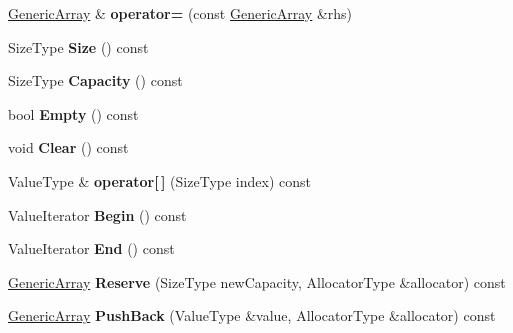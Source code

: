 \begin{DoxyCompactItemize}
\item 
\hyperlink{class_generic_array}{Generic\+Array} \& {\bfseries operator=} (const \hyperlink{class_generic_array}{Generic\+Array} \&rhs)\hypertarget{class_generic_array_addbff152092d0998b2c550bd575f4b83}{}\label{class_generic_array_addbff152092d0998b2c550bd575f4b83}

\item 
Size\+Type {\bfseries Size} () const \hypertarget{class_generic_array_a9666a5feb3fccbcec330b53742d00371}{}\label{class_generic_array_a9666a5feb3fccbcec330b53742d00371}

\item 
Size\+Type {\bfseries Capacity} () const \hypertarget{class_generic_array_a12717a6bcd3949dea08ae19a9e940d58}{}\label{class_generic_array_a12717a6bcd3949dea08ae19a9e940d58}

\item 
bool {\bfseries Empty} () const \hypertarget{class_generic_array_a85c783f2f31684901cc2fbf178b1aba5}{}\label{class_generic_array_a85c783f2f31684901cc2fbf178b1aba5}

\item 
void {\bfseries Clear} () const \hypertarget{class_generic_array_a9a67311453f8941f0ac1b5471ec6b99f}{}\label{class_generic_array_a9a67311453f8941f0ac1b5471ec6b99f}

\item 
Value\+Type \& {\bfseries operator\mbox{[}$\,$\mbox{]}} (Size\+Type index) const \hypertarget{class_generic_array_ac928627968bcfff4746f04c2cdd103ef}{}\label{class_generic_array_ac928627968bcfff4746f04c2cdd103ef}

\item 
Value\+Iterator {\bfseries Begin} () const \hypertarget{class_generic_array_a04cb899ae93f89ba91fab09381d731d3}{}\label{class_generic_array_a04cb899ae93f89ba91fab09381d731d3}

\item 
Value\+Iterator {\bfseries End} () const \hypertarget{class_generic_array_aa75006f979b2d810e6ab0ff4f755cf32}{}\label{class_generic_array_aa75006f979b2d810e6ab0ff4f755cf32}

\item 
\hyperlink{class_generic_array}{Generic\+Array} {\bfseries Reserve} (Size\+Type new\+Capacity, Allocator\+Type \&allocator) const \hypertarget{class_generic_array_affe36316cbe3f80ece8a6fc45b777a58}{}\label{class_generic_array_affe36316cbe3f80ece8a6fc45b777a58}

\item 
\hyperlink{class_generic_array}{Generic\+Array} {\bfseries Push\+Back} (Value\+Type \&value, Allocator\+Type \&allocator) const \hypertarget{class_generic_array_a6aad4336bb87edc9113f34a6d9073d53}{}\label{class_generic_array_a6aad4336bb87edc9113f34a6d9073d53}


\end{DoxyCompactItemize}
